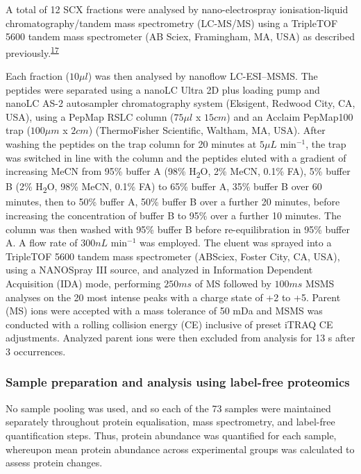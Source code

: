 \documentclass[
]{article}
\begin{document}
A total of 12 SCX fractions were analysed by nano-electrospray ionisation-liquid chromatography/tandem mass spectrometry (LC-MS/MS) using a TripleTOF 5600 tandem mass spectrometer (AB Sciex, Framingham, MA, USA) as described previously.\textsuperscript{\protect\hyperlink{ref-fuller_stathmin_2015}{17}}

Each fraction (\(10 \mu l\)) was then analysed by nanoflow LC-ESI--MSMS. The peptides were separated using a nanoLC Ultra 2D plus loading pump and nanoLC AS-2 autosampler chromatography system (Eksigent, Redwood City, CA, USA), using a PepMap RSLC column (\(75\mu l\) x \(15 cm\)) and an Acclaim PepMap100 trap (\(100\mu m\) x \(2 cm\)) (ThermoFisher Scientific, Waltham, MA, USA).
After washing the peptides on the trap column for 20 minutes at \(5\mu L\) min\(^{-1}\), the trap was switched in line with the column and the peptides eluted with a gradient of increasing MeCN from 95\% buffer A (98\% H\textsubscript{2}O, 2\% MeCN, 0.1\% FA), 5\% buffer B (2\% H\textsubscript{2}O, 98\% MeCN, 0.1\% FA) to 65\% buffer A, 35\% buffer B over 60 minutes, then to 50\% buffer A, 50\% buffer B over a further 20 minutes, before increasing the concentration of buffer B to 95\% over a further 10 minutes.
The column was then washed with 95\% buffer B before re-equilibration in 95\% buffer A. A flow rate of \(300 nL\) min\(^{-1}\) was employed. The eluent was sprayed into a TripleTOF 5600 tandem mass spectrometer (ABSciex, Foster City, CA, USA), using a NANOSpray III source, and analyzed in Information Dependent Acquisition (IDA) mode, performing \(250 ms\) of MS followed by \(100 ms\) MSMS analyses on the 20 most intense peaks with a charge state of +2 to +5. Parent (MS) ions were accepted with a mass tolerance of 50 mDa and MSMS was conducted with a rolling collision energy (CE) inclusive of preset iTRAQ CE adjustments.
Analyzed parent ions were then excluded from analysis for 13 s after 3 occurrences.

\hypertarget{label-free-sample-prep}{%
\subsubsection{Sample preparation and analysis using label-free proteomics}\label{label-free-sample-prep}}

No sample pooling was used, and so each of the 73 samples were maintained separately throughout protein equalisation, mass spectrometry, and label-free quantification steps.
Thus, protein abundance was quantified for each sample, whereupon mean protein abundance across experimental groups was calculated to assess protein changes.
\end{document}
